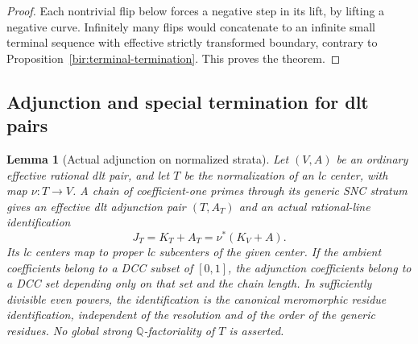 \documentclass[11pt,letterpaper]{article}
\newcommand{\Q}{\mathbb{Q}}
\newtheorem{lemma}[theorem]{Lemma}
\theoremstyle{definition}
\theoremstyle{remark}
\begin{document}
\begin{proof}
Each nontrivial flip below forces a negative step in its lift, by
lifting a negative curve.  Infinitely many flips would concatenate
to an infinite small terminal sequence with effective strictly
transformed boundary, contrary to
Proposition~\ref{bir:terminal-termination}.  This proves the theorem.
\end{proof}

\subsection{Adjunction and special termination for dlt pairs}
\label{bir:dlt-section}

\begin{lemma}[Actual adjunction on normalized strata]
\label{bir:stratum-adjunction}
Let $(V,A)$ be an ordinary effective rational dlt pair, and let $T$
be the normalization of an lc center, with map $\nu:T\to V$.  A
chain of coefficient-one primes through its generic SNC stratum
gives an effective dlt adjunction pair $(T,A_T)$ and an actual
rational-line identification
\begin{equation}
 J_T=K_T+A_T=\nu^*(K_V+A).
 \label{bir:stratum-line}
\end{equation}
Its lc centers map to proper lc subcenters of the given center.
If the ambient coefficients belong to a DCC subset of $[0,1]$, the
adjunction coefficients belong to a DCC set depending only on that
set and the chain length.  In sufficiently divisible even powers,
the identification is the canonical meromorphic residue
identification, independent of the resolution and of the order of
the generic residues.  No global strong $\Q$-factoriality of $T$ is
asserted.
\end{lemma}
\end{document}
